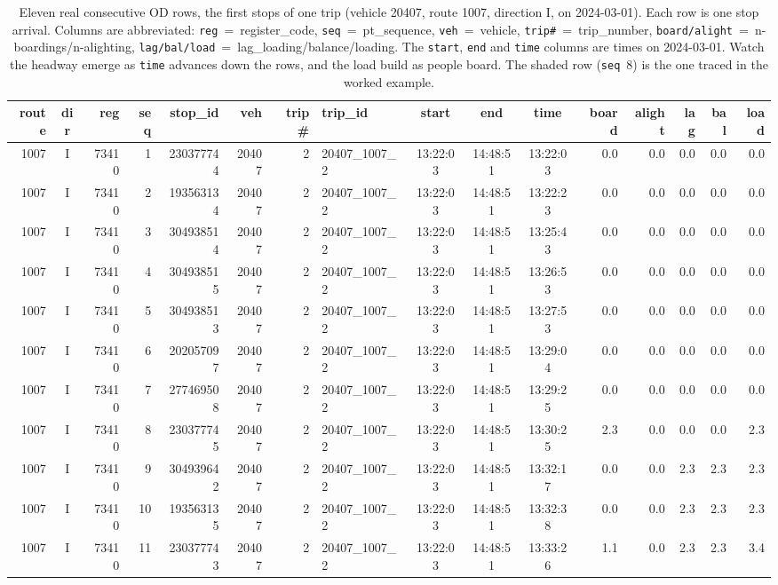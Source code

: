 \documentclass[final,5p,times,twocolumn,authoryear]{elsarticle}
\begin{document}
\begin{table}[t]
\centering
\setlength{\tabcolsep}{3pt}
\scriptsize
\caption{Eleven real consecutive OD rows, the first stops of one trip (vehicle 20407, route
1007, direction I, on 2024-03-01). Each row is one stop arrival. Columns are abbreviated:
\texttt{reg}~=~register\_code, \texttt{seq}~=~pt\_sequence, \texttt{veh}~=~vehicle,
\texttt{trip\#}~=~trip\_number, \texttt{board/alight}~=~n-boardings/n-alighting,
\texttt{lag/bal/load}~=~lag\_loading/balance/loading. The \texttt{start}, \texttt{end} and
\texttt{time} columns are times on 2024-03-01. Watch the headway emerge as \texttt{time} advances
down the rows, and the load build as people board. The shaded row (\texttt{seq}~8) is the one traced
in the worked example.}
\label{tab:odsample}
\begin{tabular}{rcrrrrrlcccrrrrr}
\toprule
route & dir & reg & seq & stop\_id & veh & trip\# & trip\_id & start & end & time & board & alight & lag & bal & load \\
\midrule
1007 & I & 73410 & 1  & 230377744 & 20407 & 2 & 20407\_1007\_2 & 13:22:03 & 14:48:51 & 13:22:03 & 0.0 & 0.0 & 0.0 & 0.0 & 0.0 \\
1007 & I & 73410 & 2  & 193563134 & 20407 & 2 & 20407\_1007\_2 & 13:22:03 & 14:48:51 & 13:22:23 & 0.0 & 0.0 & 0.0 & 0.0 & 0.0 \\
1007 & I & 73410 & 3  & 304938514 & 20407 & 2 & 20407\_1007\_2 & 13:22:03 & 14:48:51 & 13:25:43 & 0.0 & 0.0 & 0.0 & 0.0 & 0.0 \\
1007 & I & 73410 & 4  & 304938515 & 20407 & 2 & 20407\_1007\_2 & 13:22:03 & 14:48:51 & 13:26:53 & 0.0 & 0.0 & 0.0 & 0.0 & 0.0 \\
1007 & I & 73410 & 5  & 304938513 & 20407 & 2 & 20407\_1007\_2 & 13:22:03 & 14:48:51 & 13:27:53 & 0.0 & 0.0 & 0.0 & 0.0 & 0.0 \\
1007 & I & 73410 & 6  & 202057097 & 20407 & 2 & 20407\_1007\_2 & 13:22:03 & 14:48:51 & 13:29:04 & 0.0 & 0.0 & 0.0 & 0.0 & 0.0 \\
1007 & I & 73410 & 7  & 277469508 & 20407 & 2 & 20407\_1007\_2 & 13:22:03 & 14:48:51 & 13:29:25 & 0.0 & 0.0 & 0.0 & 0.0 & 0.0 \\
\rowcolor{gray!15} 1007 & I & 73410 & 8  & 230377745 & 20407 & 2 & 20407\_1007\_2 & 13:22:03 & 14:48:51 & 13:30:25 & 2.3 & 0.0 & 0.0 & 0.0 & 2.3 \\
1007 & I & 73410 & 9  & 304939642 & 20407 & 2 & 20407\_1007\_2 & 13:22:03 & 14:48:51 & 13:32:17 & 0.0 & 0.0 & 2.3 & 2.3 & 2.3 \\
1007 & I & 73410 & 10 & 193563135 & 20407 & 2 & 20407\_1007\_2 & 13:22:03 & 14:48:51 & 13:32:38 & 0.0 & 0.0 & 2.3 & 2.3 & 2.3 \\
1007 & I & 73410 & 11 & 230377743 & 20407 & 2 & 20407\_1007\_2 & 13:22:03 & 14:48:51 & 13:33:26 & 1.1 & 0.0 & 2.3 & 2.3 & 3.4 \\
\bottomrule
\end{tabular}
\end{table}
\end{document}
